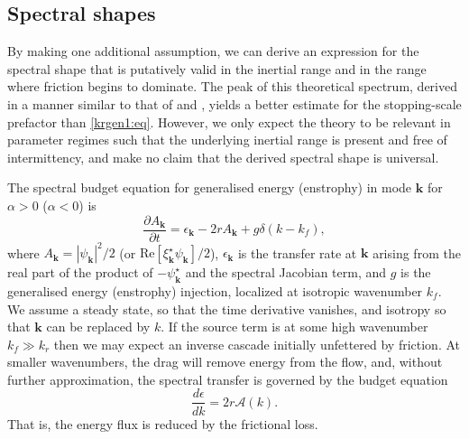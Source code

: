 \documentclass{jfm}
\newcommand{\ca}  [1]{\mathcal{#1}}
\newcommand{\kb}  {\boldsymbol{k}}
\newcommand{\p}   {\partial}
\newcommand{\pp}  [2]{\frac{\p #1}{\p #2}}
\newcommand{\dd}  [2]{\frac{d #1}{d #2}}
\begin{document}
\subsection{Spectral shapes}
\label{univ:ssc}

By making one additional assumption, we can derive an expression for
the spectral shape that is putatively valid in the inertial range and
in the range where friction begins to dominate.  The peak of this
theoretical spectrum, derived in a manner similar to that of
\citet{Leith68a} and \citet{Lilly72}, yields a better estimate for the
stopping-scale prefactor than \eqref{krgen1:eq}. However, we only
expect the theory to be relevant in parameter regimes such that the
underlying inertial range is present and free of intermittency, and
make no claim that the derived spectral shape is universal.

The spectral budget equation for generalised energy (enstrophy) in
mode $\kb$ for $\alpha>0$ ($\alpha<0$) is
\begin{equation}
\pp{A_{\kb}}{t} = \epsilon_{\kb} - 2rA_{\kb} + g\delta(k-k_f),
\label{A:eq}
\end{equation}
where $A_{\kb} = |\psi_{\kb}|^2/2$ (or
$\mathrm{Re}\left[\xi_{\kb}^{\star}\psi_{\kb}\right]/2$),
$\epsilon_{\kb}$ is the transfer rate at $\kb$ arising from the real
part of the product of $-\psi_{\kb}^{\star}$ and the spectral Jacobian
term, and $g$ is the generalised energy (enstrophy) injection,
localized at isotropic wavenumber $k_f$.  We assume a steady state, so
that the time derivative vanishes, and isotropy so that $\kb$ can be
replaced by $k$.  If the source term is at some high wavenumber $k_f
\gg k_r$ then we may expect an inverse cascade initially unfettered by
friction.  At smaller wavenumbers, the drag will remove energy from
the flow, and, without further approximation, the spectral transfer is
governed by the budget equation
\begin{equation}
\dd{\epsilon}{k} = 2r\ca{A}(k).
\label{epsr:eq}
\end{equation}
That is, the energy flux is reduced by the frictional loss.
\end{document}
